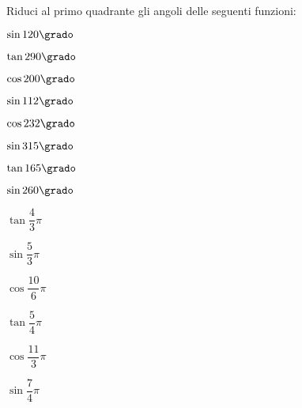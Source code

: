 \begin{esercizio}\label{ese:03.1}
Riduci al primo quadrante gli angoli delle seguenti funzioni:
\begin{multicols}{4}
 \begin{enumeratea}
  \item $\sin 120 \grado$
   \hfill
  \item $\tan 290 \grado$
   \hfill
  \item $\cos 200 \grado$ 
   \hfill
  \item $\sin 112 \grado$ 
   \hfill
  \item $\cos 232 \grado$ 
   \hfill
  \item $\sin 315 \grado$ 
   \hfill
  \item $\tan 165 \grado$ 
   \hfill
  \item $\sin 260 \grado$ 
   \hfill
  \item $\tan \dfrac{4}{3}\pi$ 
   \hfill
  \item $\sin \dfrac{5}{3}\pi$ 
   \hfill
  \item $\cos \dfrac{10}{6}\pi$ 
   \hfill
  \item $\tan \dfrac{5}{4}\pi$ 
   \hfill
  \item $\cos \dfrac{11}{3}\pi$ 
   \hfill
  \item $\sin \dfrac{7}{4}\pi$ 
   \hfill
 \end{enumeratea}
 \end{multicols}
\end{esercizio}

\subsubsection*{}

